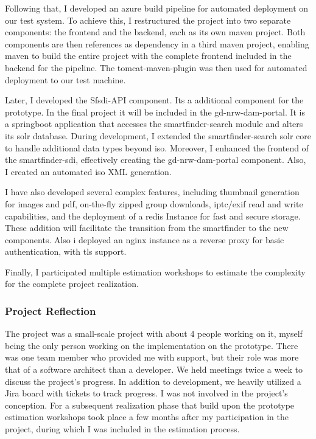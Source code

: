 \documentclass[11pt, titlepage, a4paper]{article}
\begin{document}
Following that, I developed an \Gls{azure} build pipeline for automated deployment on our test system.  To achieve this, I restructured the project into two separate components: the frontend and the backend, each as its own \Gls{maven} project. %
Both components are then references as dependency in a third \Gls{maven} project, enabling \Gls{maven} to build the entire project with the complete frontend included in the backend for the pipeline. The tomcat-maven-plugin was then used for automated deployment to our test machine.

Later, I developed the Sfsdi-API component. Its a additional component for the prototype. In the final project it will be included in the gd-nrw-dam-portal. It is a \Gls{springboot} application that accesses the smartfinder-search module and alters its \Gls{solr} database. During development, I extended the smartfinder-search \Gls{solr} core to handle additional data types beyond \gls{iso}. Moreover, I enhanced the frontend of the smartfinder-sdi, effectively creating the gd-nrw-dam-portal component.
Also, I created an automated \gls{iso} XML generation.

I have also developed several complex features, including thumbnail generation for images and \gls{pdf}, on-the-fly zipped group downloads, \gls{iptc}/\gls{exif} read and write capabilities, and the deployment of a \Gls{redis} Instance for fast and secure storage. These addition will facilitate the transition from the smartfinder to the new components. Also i deployed an \Gls{nginx} instance as a reverse proxy for basic authentication, with \gls{tls} support.

Finally, I participated multiple estimation workshops to estimate the complexity for the complete project realization.

\subsubsection{Project Reflection}
The project was a small-scale project with about 4 people working on it, myself being the only person working on the implementation on the prototype. There was one team member who provided me with support, but their role was more that of a software architect than a developer.
We held meetings twice a week to discuss the project's progress. In addition to development, we heavily utilized a Jira board with tickets to track progress. I was not involved in the project's conception.
For a subsequent realization phase that build upon the prototype estimation workshops took place a few months after my participation in the project, during which I was included in the estimation process.
\end{document}
